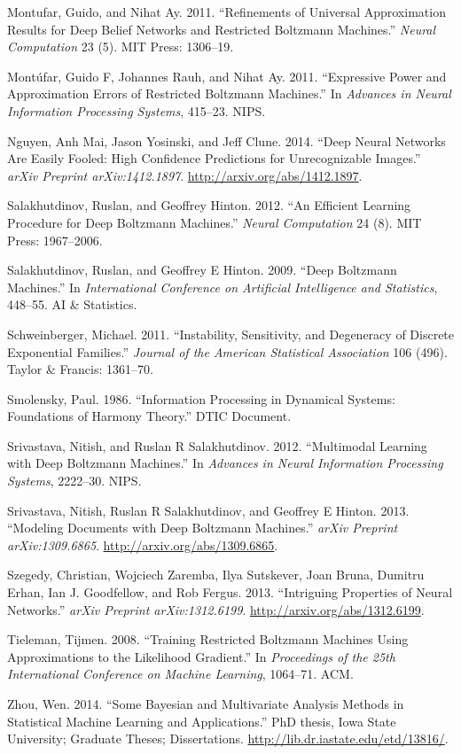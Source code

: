 \documentclass[12pt]{article}
\theoremstyle{definition}
\begin{document}
\hypertarget{ref-montufar2011refinements}{}
Montufar, Guido, and Nihat Ay. 2011. ``Refinements of Universal
Approximation Results for Deep Belief Networks and Restricted Boltzmann
Machines.'' \emph{Neural Computation} 23 (5). MIT Press: 1306--19.

\hypertarget{ref-montufar2011expressive}{}
Montúfar, Guido F, Johannes Rauh, and Nihat Ay. 2011. ``Expressive Power
and Approximation Errors of Restricted Boltzmann Machines.'' In
\emph{Advances in Neural Information Processing Systems}, 415--23. NIPS.

\hypertarget{ref-nguyen2014deep}{}
Nguyen, Anh Mai, Jason Yosinski, and Jeff Clune. 2014. ``Deep Neural
Networks Are Easily Fooled: High Confidence Predictions for
Unrecognizable Images.'' \emph{arXiv Preprint arXiv:1412.1897}.
\url{http://arxiv.org/abs/1412.1897}.

\hypertarget{ref-salakhutdinov2012efficient}{}
Salakhutdinov, Ruslan, and Geoffrey Hinton. 2012. ``An Efficient
Learning Procedure for Deep Boltzmann Machines.'' \emph{Neural
Computation} 24 (8). MIT Press: 1967--2006.

\hypertarget{ref-salakhutdinov2009deep}{}
Salakhutdinov, Ruslan, and Geoffrey E Hinton. 2009. ``Deep Boltzmann
Machines.'' In \emph{International Conference on Artificial Intelligence
and Statistics}, 448--55. AI \& Statistics.

\hypertarget{ref-schweinberger2011instability}{}
Schweinberger, Michael. 2011. ``Instability, Sensitivity, and Degeneracy
of Discrete Exponential Families.'' \emph{Journal of the American
Statistical Association} 106 (496). Taylor \& Francis: 1361--70.

\hypertarget{ref-smolensky1986information}{}
Smolensky, Paul. 1986. ``Information Processing in Dynamical Systems:
Foundations of Harmony Theory.'' DTIC Document.

\hypertarget{ref-srivastava2012multimodal}{}
Srivastava, Nitish, and Ruslan R Salakhutdinov. 2012. ``Multimodal
Learning with Deep Boltzmann Machines.'' In \emph{Advances in Neural
Information Processing Systems}, 2222--30. NIPS.

\hypertarget{ref-srivastava2013modeling}{}
Srivastava, Nitish, Ruslan R Salakhutdinov, and Geoffrey E Hinton. 2013.
``Modeling Documents with Deep Boltzmann Machines.'' \emph{arXiv
Preprint arXiv:1309.6865}. \url{http://arxiv.org/abs/1309.6865}.

\hypertarget{ref-szegedy2013intriguing}{}
Szegedy, Christian, Wojciech Zaremba, Ilya Sutskever, Joan Bruna,
Dumitru Erhan, Ian J. Goodfellow, and Rob Fergus. 2013. ``Intriguing
Properties of Neural Networks.'' \emph{arXiv Preprint arXiv:1312.6199}.
\url{http://arxiv.org/abs/1312.6199}.

\hypertarget{ref-tieleman2008training}{}
Tieleman, Tijmen. 2008. ``Training Restricted Boltzmann Machines Using
Approximations to the Likelihood Gradient.'' In \emph{Proceedings of the
25th International Conference on Machine Learning}, 1064--71. ACM.

\hypertarget{ref-zhou2014some}{}
Zhou, Wen. 2014. ``Some Bayesian and Multivariate Analysis Methods in
Statistical Machine Learning and Applications.'' PhD thesis, Iowa State
University; Graduate Theses; Dissertations.
\url{http://lib.dr.iastate.edu/etd/13816/}.
\end{document}
